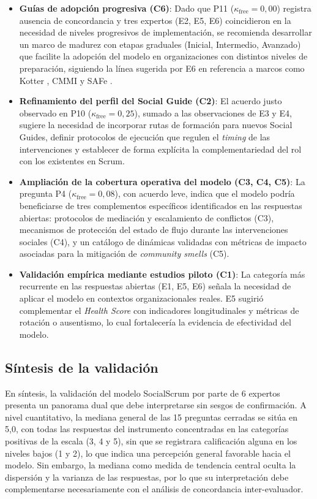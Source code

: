 \begin{itemize}
   \item \textbf{Guías de adopción progresiva (C6)}: Dado que P11 ($\kappa_{\text{free}} = 0{,}00$) registra ausencia de concordancia y tres expertos (E2, E5, E6) coincidieron en la necesidad de niveles progresivos de implementación, se recomienda desarrollar un marco de madurez con etapas graduales (Inicial, Intermedio, Avanzado) que facilite la adopción del modelo en organizaciones con distintos niveles de preparación, siguiendo la línea sugerida por E6 en referencia a marcos como Kotter \cite{kotter1996leading}, CMMI \cite{cmmidev13} y SAFe \cite{SafeFramework}.
   \item \textbf{Refinamiento del perfil del Social Guide (C2)}: El acuerdo justo observado en P10 ($\kappa_{\text{free}} = 0{,}25$), sumado a las observaciones de E3 y E4, sugiere la necesidad de incorporar rutas de formación para nuevos Social Guides, definir protocolos de ejecución que regulen el \textit{timing} de las intervenciones y establecer de forma explícita la complementariedad del rol con los existentes en Scrum.
   \item \textbf{Ampliación de la cobertura operativa del modelo (C3, C4, C5)}: La pregunta P4 ($\kappa_{\text{free}} = 0{,}08$), con acuerdo leve, indica que el modelo podría beneficiarse de tres complementos específicos identificados en las respuestas abiertas: protocolos de mediación y escalamiento de conflictos (C3), mecanismos de protección del estado de flujo durante las intervenciones sociales (C4), y un catálogo de dinámicas validadas con métricas de impacto asociadas para la mitigación de \textit{community smells} (C5).
   \item \textbf{Validación empírica mediante estudios piloto (C1)}: La categoría más recurrente en las respuestas abiertas (E1, E5, E6) señala la necesidad de aplicar el modelo en contextos organizacionales reales. E5 sugirió complementar el \textit{Health Score} con indicadores longitudinales y métricas de rotación o ausentismo, lo cual fortalecería la evidencia de efectividad del modelo.
\end{itemize}

\subsection{Síntesis de la validación}
En síntesis, la validación del modelo SocialScrum por parte de 6 expertos presenta un panorama dual que debe interpretarse sin sesgos de confirmación. A nivel cuantitativo, la mediana general de las 15 preguntas cerradas se sitúa en 5,0, con todas las respuestas del instrumento concentradas en las categorías positivas de la escala (3, 4 y 5), sin que se registrara calificación alguna en los niveles bajos (1 y 2), lo que indica una percepción general favorable hacia el modelo. Sin embargo, la mediana como medida de tendencia central oculta la dispersión y la varianza de las respuestas, por lo que su interpretación debe complementarse necesariamente con el análisis de concordancia inter-evaluador.

